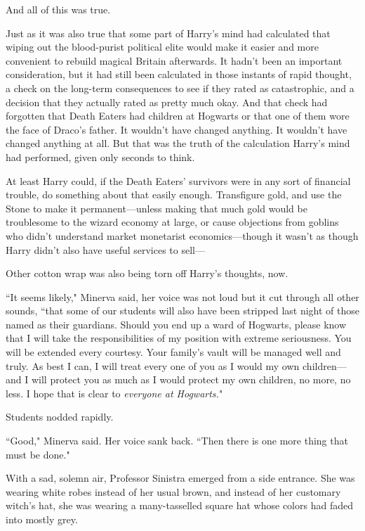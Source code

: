 And all of this was true.

Just as it was also true that some part of Harry's mind had calculated that wiping out the blood-purist political elite would make it easier and more convenient to rebuild magical Britain afterwards. It hadn't been an important consideration, but it had still been calculated in those instants of rapid thought, a check on the long-term consequences to see if they rated as catastrophic, and a decision that they actually rated as pretty much okay. And that check had forgotten that Death Eaters had children at Hogwarts or that one of them wore the face of Draco's father. It wouldn't have changed anything. It wouldn't have changed anything at all. But that was the truth of the calculation Harry's mind had performed, given only seconds to think.

At least Harry could, if the Death Eaters' survivors were in any sort of financial trouble, do something about that easily enough. Transfigure gold, and use the Stone to make it permanent---unless making that much gold would be troublesome to the wizard economy at large, or cause objections from goblins who didn't understand market monetarist economics---though it wasn't as though Harry didn't also have useful services to sell---

Other cotton wrap was also being torn off Harry's thoughts, now.

``It seems likely," Minerva said, her voice was not loud but it cut through all other sounds, ``that some of our students will also have been stripped last night of those named as their guardians. Should you end up a ward of Hogwarts, please know that I will take the responsibilities of my position with extreme seriousness. You will be extended every courtesy. Your family's vault will be managed well and truly. As best I can, I will treat every one of you as I would my own children---and I will protect you as much as I would protect my own children, no more, no less. I hope that is clear to \emph{everyone at Hogwarts.}"

Students nodded rapidly.

``Good," Minerva said. Her voice sank back. ``Then there is one more thing that must be done."

With a sad, solemn air, Professor Sinistra emerged from a side entrance. She was wearing white robes instead of her usual brown, and instead of her customary witch's hat, she was wearing a many-tasselled square hat whose colors had faded into mostly grey.

